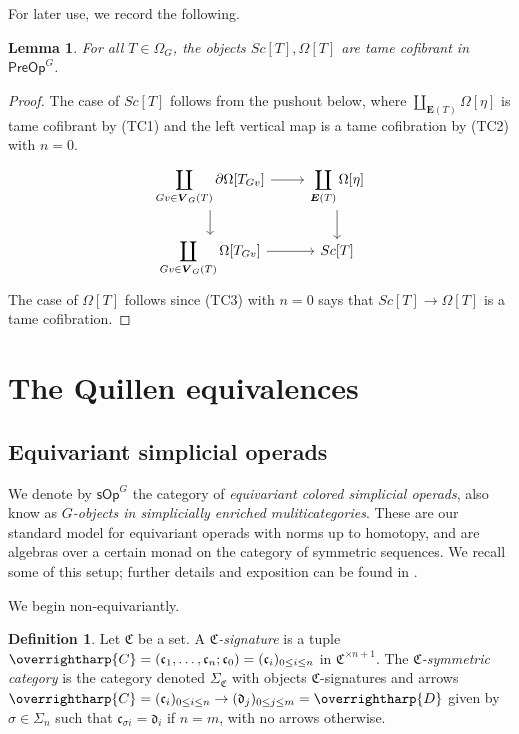 \documentclass[a4paper,10pt
,draft
]{article}%
\numberwithin{equation}{section}
\numberwithin{figure}{section}
\newtheorem{lemma}[equation]{Lemma}%
\theoremstyle{definition} %
\newtheorem{definition}[equation]{Definition}%
\newcommand{\vect}[1]{\text{\overrightharp{\ensuremath{#1}}}}
\newcommand{\1}{\ensuremath{\mathbbm 1}}%
\begin{document}
For later use, we record the following.

\begin{lemma}\label{OMEGATTAME_LEM}
	For all $T \in \Omega_G$, the objects $Sc[T],\Omega[T]$ are tame cofibrant in $\mathsf{PreOp}^G$.
\end{lemma}

\begin{proof}
	The case of $Sc[T]$ follows from the pushout below, 
	where $\coprod_{\boldsymbol{E}(T)}\Omega[\eta]$
	is tame cofibrant by (TC1) and the left vertical map is 
	a tame cofibration by (TC2) with $n=0$.
	\[
	\begin{tikzcd}
	\displaystyle{
		\coprod_{Gv \in \boldsymbol{V}_G(T)} \partial\Omega[T_{Gv}]
	}
	\arrow[d] \arrow[r]
	&
	\displaystyle{
		\coprod_{\boldsymbol{E}(T)} \Omega[\eta]
	}
	\arrow[d]
	\\
	\displaystyle{
		\coprod_{Gv \in \boldsymbol{V}_G(T)} \Omega[T_{Gv}]
	}
	\arrow[r]
	&
	Sc[T]
	\end{tikzcd}
	\]
	The case of $\Omega[T]$
	follows since (TC3) with $n=0$
	says that $Sc[T] \to \Omega[T]$ is a tame cofibration.
\end{proof}






\section{The Quillen equivalences}
\label{QE_SEC}






\subsection{Equivariant simplicial operads}

We denote by $\mathsf{sOp}^G$ the category of \textit{equivariant colored simplicial operads}, also know as \textit{$G$-objects in simplicially enriched muliticategories}.
These are our standard model for equivariant operads with norms up to homotopy,
and are algebras over a certain monad on the category of symmetric sequences.
We recall some of this setup; further details and exposition can be found in \cite[\S 2]{BP_HGOP}.

We begin non-equivariantly.
\begin{definition}
      Let $\mathfrak C$ be a set. A \textit{$\mathfrak C$-signature} is a tuple
      $\vect C = (\mathfrak c_1, \dots, \mathfrak c_n; \mathfrak c_0) = (\mathfrak c_i)_{0 \leq i \leq n}$ in $\mathfrak C^{\times n+1}$.
      The \textit{$\mathfrak C$-symmetric category} is the category denoted $\Sigma_{\mathfrak C}$ with
      objects $\mathfrak C$-signatures and
      arrows $\vect C = (\mathfrak c_i)_{0 \leq i \leq n} \to (\mathfrak d_j)_{0 \leq j \leq m} = \vect D$
      given by $\sigma \in \Sigma_n$ such that $\mathfrak c_{\sigma i} = \mathfrak d_i$ if $n = m$, with no arrows otherwise.
\end{definition}
\end{document}
